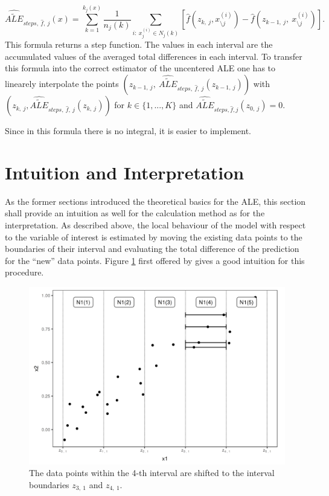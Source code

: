 \documentclass[]{krantz}
\begin{document}
\[  \widehat{\widetilde{ALE}}_{steps,~\hat{f},~j}(x) =  \sum_{k=1}^{k_j(x)}   \frac{1}{n_j(k)}\sum_{i:~x_j^{(i)}\in N_j(k)} [\hat{f}(z_{k,~j}, x_{\setminus j}^{(i)})-\hat{f}(z_{k-1,~j},~x_{\setminus j}^{(i)})].  \]
This formula returns a step function. The values in each interval are
the accumulated values of the averaged total differences in each
interval. To transfer this formula into the correct estimator of the
uncentered ALE one has to linearely interpolate the points
\((z_{k-1,~j},~\widehat{\widetilde{ALE}}_{steps,~\hat{f},~j}(z_{k-1,~j}))\)
with
\(( z_{k,~j},\widehat{\widetilde{ALE}}_{steps,~ \hat{f},~j}(z_{k,~j}))\)
for \(k \in \{1, ..., K \}\) and
\(\widehat{\widetilde{ALE}}_{steps, \hat{f},j}(z_{0,~j}) = 0\).

Since in this formula there is no integral, it is easier to implement.

\section{Intuition and Interpretation}\label{ale-intro-interpret}

As the former sections introduced the theoretical basics for the ALE,
this section shall provide an intuition as well for the calculation
method as for the interpretation. As described above, the local
behaviour of the model with respect to the variable of interest is
estimated by moving the existing data points to the boundaries of their
interval and evaluating the total difference of the prediction for the
``new'' data points. Figure \ref{fig:dataALE} first offered by
\citep{molnar2019} gives a good intuition for this procedure.

\begin{figure}
\includegraphics[width=1\linewidth]{images/ale_estimation_intuition} \caption{The data points within the 4-th interval are shifted
to the interval boundaries \(z_{3,~1}\) and \(z_{4,~1}\).}\label{fig:dataALE}
\end{figure}
\end{document}

